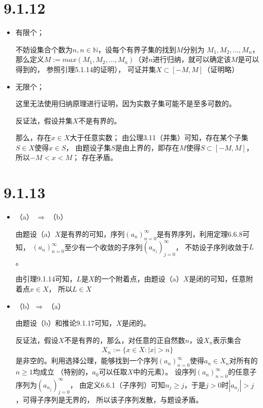 \documentclass{article}
\begin{document}
\section*{9.1.12}

\begin{itemize}
      \item 有限个；

            不妨设集合个数为$n, n \in \mathbb{N}$，设每个有界子集的找到$M$分别为
            $M_1, M_2, \dots, M_n$，
            那么定义$M := max(M_1, M_2, \dots, M_n)$（对$n$进行归纳，就可以确定该$M$是可以得到的，
            参照引理5.1.14的证明），
            可证并集$X \subset [-M, M]$（证明略）

      \item 无限个；
            \begin{zremark}
                  这里无法使用归纳原理进行证明，因为实数子集可能不是至多可数的。
            \end{zremark}


            反证法，假设并集$X$不是有界的。

            那么，存在$x \in X$大于任意实数；
            由公理3.11（并集）可知，存在某个子集$S \in X \text{使得}x \in S$，
            由题设子集$S$是由上界的，即存在$M$使得$S \subset [-M, M]$，所以$-M < x < M$；
            存在矛盾。
\end{itemize}

\section*{9.1.13}

\begin{itemize}
      \item （a） $\Rightarrow$ （b）

            由题设（a）$X$是有界的可知，序列$(a_n)_{n=0}^\infty$是有界序列，利用定理6.6.8可知，
            $(a_n)_{n=0}^\infty$至少有一个收敛的子序列$(a_{n_j})_{j=0}^\infty$，
            不妨设子序列收敛于$L$。

            由引理9.1.14可知，$L$是$X$的一个附着点，由题设（a）$X$是闭的可知，任意附着点$x \in X$，
            所以$L \in X$

      \item （b）$\Rightarrow$ （a）

            由题设（b）和推论9.1.17可知，$X$是闭的。

            反证法，假设$X$不是有界的，那么，对任意的正自然数$n$，设$X_n$表示集合
            \begin{align*}
                  X_n := \{x \in X : |x| > n\}
            \end{align*}
            是非空的。利用选择公理，能够找到一个序列$(a_n)_{n=0}^\infty$使得$a_n \in X_n$对所有的$n \geq 1$均成立
            （特别的，$a_0$可以任取$X$中的元素）。
            设序列$(a_n)_{n=0}^\infty$的任意子序列为$(a_{n_j})_{j=0}^\infty$，
            由定义6.6.1（子序列）可知$n_j \geq j$，于是$j>0$时$|a_{n_j}| > j$，可得子序列是无界的，
            所以该子序列发散，与题设矛盾。
\end{itemize}
\end{document}

